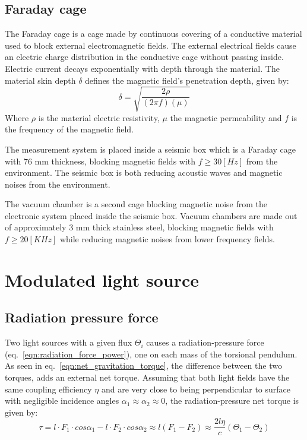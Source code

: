 \documentclass[\main/master.tex]{subfiles}
\begin{document}
\subsection{Faraday cage}
\par\noindent
The Faraday cage is a cage made by continuous covering of a conductive material used to block external electromagnetic fields. The external electrical fields cause an electric charge distribution in the conductive cage without passing inside. Electric current decays exponentially with depth through the material. The material skin depth $\delta$ defines the magnetic field's penetration depth, given by:
\begin{equation}
\delta = \sqrt{\frac{2\rho}{(2\pi f)(\mu)} }    \label{eqn:skin depth}
\end{equation}
Where $\rho$ is the material electric resistivity, $\mu$ the magnetic permeability and $f$ is the frequency of the magnetic field.
\par\noindent
The measurement system is placed inside a seismic box which is a Faraday cage with 76 mm thickness, blocking magnetic fields with $f \ge 30 [Hz]$ from the environment. The seismic box is both reducing acoustic waves and magnetic noises from the environment.
\par\noindent
The vacuum chamber is a second cage blocking magnetic noise from the electronic system placed inside the seismic box. Vacuum chambers are made out of approximately 3 mm thick stainless steel, blocking magnetic fields with $f\ge 20 [KHz]$ while reducing magnetic noises from lower frequency fields.


\section{Modulated light source}
\subsection{Radiation pressure force}
Two light sources with a given flux $\Theta_i$ causes a radiation-pressure force (eq.~\ref{eqn:radiation_force_power}), one on each mass of the torsional pendulum. As seen in eq.~\ref{eqn:net_gravitation_torque}, the difference between the two torques, adds an external net torque. Assuming that both light fields have the same coupling efficiency $\eta$ and are very close to being perpendicular to surface with negligible incidence angles $\alpha_1\approx\alpha_2\approx 0$, the radiation-pressure net torque is given by:  
\begin{equation}
\tau = l\cdot F_1 \cdot cos\alpha_1 - l\cdot F_2 \cdot cos\alpha_2\approx l(F_1 - F_2) \approx \frac{2l\eta}{{c}} (\Theta_1 -\Theta_2)  \label{eqn:radiation torque}
\end{equation}
\end{document}
